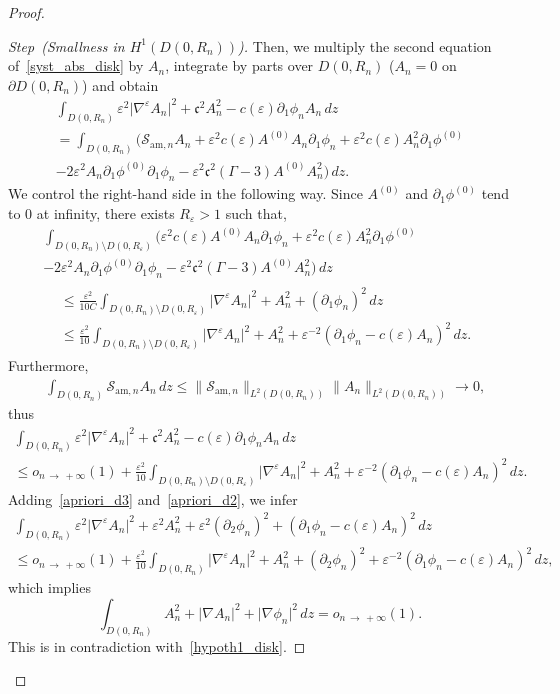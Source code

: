\documentclass[AHL,Unicode,longabstracts,published]{cedram}
\newcommand*\p{\partial}
\newcommand{\amm}{\mathrm{am}}
\newcommand*\BS{\mathcal{S}}
\newcommand*\cs{{\mathfrak c}}
\newcommand*\ii{\infty}
\newcommand*\ls{\leqslant }
\newcommand*\e{\varepsilon}
\newcounter{stepcount}
\newenvironment{step}[1]{\refstepcounter{stepcount}\begin{proof}[{Step~\thestepcount}{\;(#1)}]}{\let\qed\relax\end{proof}}
\begin{document}
\begin{proof}
\begin{step}{{Smallness in $ H^1 (D(0, R_n))$}}
Then, we multiply the second equation of~\eqref{syst_abs_disk} by $ A_n $, integrate by parts over $ D(0,R_n) $ ($A_n =0 $ on $ \p D(0, R_n) $) and obtain
\begin{multline*}
\int_{D(0,R_n)}  \e^2 \lvert \nabla^{\e} A_n \rvert^2 + \cs^2 A_n^2 - c(\e) \p_1 \phi_n A_n \, dz
\\  = \int_{D(0,R_n)} \Big(\BS_{{\amm},n} A_n + \e^2 c(\e) A^{(0)} A_n \p_1 \phi_n + \e^2 c(\e) A_n^2 \p_1 \phi^{(0)}
\\ - 2 \e^2 A_n \p_{1} \phi^{(0)} \p_{1} \phi_n - \e^2 \cs^2 (\Gamma -3) A^{(0)} A_n^2 \Big) \, dz.
\end{multline*}
We control the right-hand side in the following way. Since $ A^{(0)} $ and $ \p_1 \phi^{(0)} $ tend to $0$ at infinity, there exists $ R_\e > 1 $ such that,
\begin{multline*}
 \int_{D(0,R_n) \setminus D(0,R_\e)}
\Big(\e^2 c(\e) A^{(0)} A_n \p_1 \phi_n + \e^2 c(\e) A_n^2 \p_1 \phi^{(0)}
\\ - 2 \e^2 A_n \p_{1} \phi^{(0)} \p_{1} \phi_n - \e^2 \cs^2 (\Gamma -3) A^{(0)} A_n^2 \Big) \, dz
\\
\begin{aligned}
 & \ls
\frac{\e^2}{10 C } \int_{D(0,R_n) \setminus D(0,R_\e)} \lvert \nabla^{\e} A_n \rvert^2 + A_n^2 + (\p_1 \phi_n)^2 \, dz
\\ & \ls
\frac{\e^2}{10} \int_{D(0,R_n) \setminus D(0,R_\e)} \lvert \nabla^{\e} A_n \rvert^2 + A_n^2 + \e^{-2} (\p_1 \phi_n - c (\e) A_n)^2 \, dz.
\end{aligned}
\end{multline*}
Furthermore,
\begin{align*}
& \int_{D(0,R_n) } \BS_{{\amm},n} A_n \, dz
\ls \| \BS_{{\amm},n} \|_{L^2(D(0,R_n))} \| A_n \|_{L^2(D(0,R_n))}
\to 0,
\end{align*}
thus
\begin{multline}\label{apriori_d3}
\int_{D(0,R_n)} \e^2 \lvert \nabla^{\e} A_n \rvert^2 + \cs^2 A_n^2 - c(\e) \p_1 \phi_n A_n \, dz \\
\ls o_{n\, \to\,+\ii} (1) + \frac{\e^2}{10} \int_{D(0,R_n) \setminus D(0,R_\e)} \lvert \nabla^{\e} A_n \rvert^2 + A_n^2 + \e^{-2} (\p_1 \phi_n - c (\e) A_n)^2 \, dz.
\end{multline}
Adding~\eqref{apriori_d3} and~\eqref{apriori_d2}, we infer
\begin{multline*}
\int_{D(0,R_n)} \e^2 \lvert \nabla^{\e} A_n \rvert^2 + \e^2 A_n^2 + \e^2 (\p_2 \phi_n)^2 + (\p_1 \phi_n - c(\e) A_n)^2 \, dz
\\  \ls o_{n\, \to\,+\ii} (1) + \frac{\e^2}{10} \int_{D(0,R_n)} \lvert \nabla^{\e} A_n \rvert^2 + A_n^2 + (\p_2 \phi_n)^2 + \e^{-2} (\p_1 \phi_n - c(\e) A_n)^2 \, dz,
\end{multline*}
which implies
\begin{equation}\label{apriori_d5}
\int_{D(0,R_n)} A_n^2 + \lvert \nabla A_n \rvert^2 + \lvert \nabla \phi_n \rvert^2
\, dz = o_{n\,\to\,+\ii} (1).
\end{equation}
This is in contradiction with~\eqref{hypoth1_disk}.\qedhere
\end{step}\let\qed\relax
\end{proof}
\end{document}
